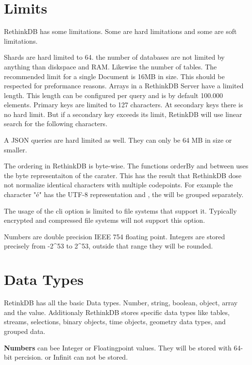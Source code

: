 \section{Limits}

RethinkDB has some limitations. 
Some are hard limitations and some are soft limitations.
\cite{RethinkLimits}

Shards are hard limited to 64.
the number of databases are not limited by anything than diskspace and RAM.
Likewise the number of tables.
The recommended limit for a single Document is 16MB in size.
This should be respected for preformance reasons.
Arrays in a RethinkDB Server have a limited length.
This length can be configured per query and is by default 100.000 elements.
Primary keys are limited to 127 characters.
At secondary keys there is no hard limit.
But if a secondary key exceeds its limit, RetinkDB will use linear search for the following characters.

A JSON queries are hard limited as well.
They can only be 64 MB in size or smaller.

The ordering in RethinkDB is byte-wise.
The functions orderBy and between uses the byte representaiton of the carater.
This has the result that RethinkDB dose not normalize identical characters with multiple codepoints.
For example the character "é" has the UTF-8 representation  and , the will be grouped separately.

The usage of the cli option  is limited to file systems that support it.
Typically encrypted and compressed file systems will not support this option.

Numbers are double precision IEEE 754 floating point.
Integers are stored precisely from -2^53 to 2^53, outside that range they will be rounded.

\section{Data Types}

RetinkDB has all the basic Data types. 
Number, string, boolean, object, array and the  value. 
Additionaly RethinkDB stores specific data types like tables, streams, selections, binary objects, time objects, geometry data types, and grouped data.
\cite{RethinkDataTypes}

\textbf{Numbers} can bee Integer or Floatingpoint values. 
They will be stored with 64-bit percision.
 or Infinit can not be stored.

